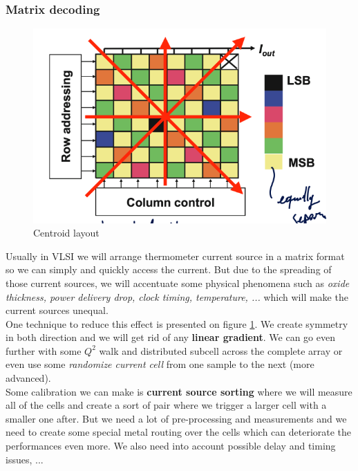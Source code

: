 \documentclass{report}
\begin{document}
\subsubsection{Matrix decoding}

\begin{figure}
    \centering
    \includegraphics[width=1\linewidth]{img/centroid_layout.png}
    \caption{Centroid layout}
    \label{fig:centroid-layout-label}
\end{figure}

Usually in VLSI we will arrange thermometer current source in a matrix format so we can simply and quickly access the current. But due to the spreading of those current sources, we will accentuate some physical phenomena such as \textit{oxide thickness, power delivery drop, clock timing, temperature, ...} which will make the current sources unequal.\\

One technique to reduce this effect is presented on figure \ref{fig:centroid-layout-label}. We create symmetry in both direction and we will get rid of any \textbf{linear gradient}. We can go even further with some $Q^2$ walk and distributed subcell across the complete array or even use some \textit{randomize current cell} from one sample to the next (more advanced).\\

Some calibration we can make is \textbf{current source sorting} where we will measure all of the cells and create a sort of pair where we trigger a larger cell with a smaller one after. But we need a lot of pre-processing and measurements and we need to create some special metal routing over the cells which can deteriorate the performances even more. We also need into account possible delay and timing issues, ...
\end{document}
